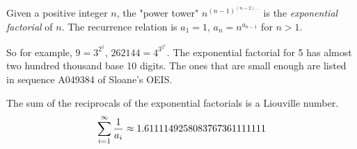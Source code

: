 \documentclass[12pt]{article}
\begin{document}
Given a positive integer $n$, the "power tower" $n^{(n - 1)^{(n - 2) \dots }}$ is the {\em exponential factorial} of $n$. The recurrence relation is $a_1 = 1$, $a_n = n^{a_{n - 1}}$ for $n > 1$.

So for example, $9 = 3^{2^1}$, $262144 = 4^{3^{2^1}}$. The exponential factorial for 5 has almost two hundred thousand base 10 digits. The ones that are small enough are listed in sequence A049384 of Sloane's OEIS.

The sum of the reciprocals of the exponential factorials is a Liouville number. $$\sum_{i = 1}^\infty {1 \over a_i} \approx 1.6111149258083767361111111$$
\end{document}
